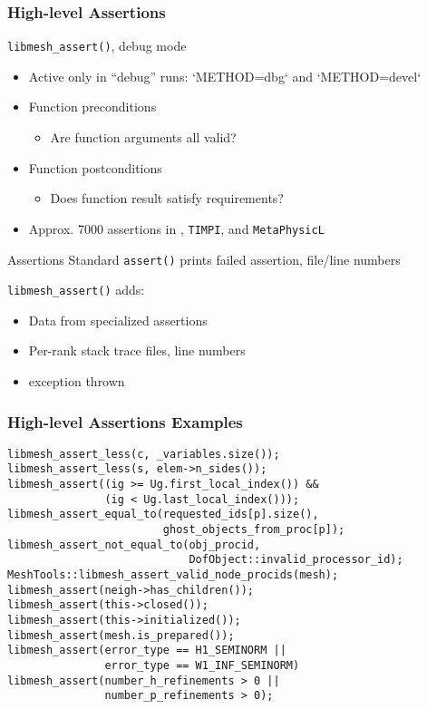 \begin{frame}
\frametitle{High-level Assertions}
\begin{block}{{\texttt{libmesh\_assert()}, \PETSc} debug mode}
\begin{itemize}
\item Active only in ``debug'' runs: `METHOD=dbg` and `METHOD=devel`
\item Function preconditions
\begin{itemize}
\item Are function arguments all valid?
\end{itemize}
\item Function postconditions
\begin{itemize}
\item Does function result satisfy requirements?
\end{itemize}
\item Approx. 7000 assertions in \libMesh{}, \texttt{TIMPI}, and
  \texttt{MetaPhysicL}
\end{itemize}
\end{block}

 \begin{block}{\libMesh{} Assertions}
Standard \texttt{assert()} prints failed assertion, file/line numbers

\texttt{libmesh\_assert()} adds:
\begin{itemize}
\item Data from specialized assertions
\item Per-rank stack trace files, line numbers
\item \cpp{} exception thrown
\end{itemize}
\end{block}

\end{frame}

\begin{frame}[fragile]
\frametitle{High-level Assertions Examples}
{\footnotesize
\begin{verbatim}
libmesh_assert_less(c, _variables.size());
libmesh_assert_less(s, elem->n_sides());
libmesh_assert((ig >= Ug.first_local_index()) &&
               (ig < Ug.last_local_index()));
libmesh_assert_equal_to(requested_ids[p].size(),
                        ghost_objects_from_proc[p]);
libmesh_assert_not_equal_to(obj_procid,
                            DofObject::invalid_processor_id);
MeshTools::libmesh_assert_valid_node_procids(mesh);
libmesh_assert(neigh->has_children());
libmesh_assert(this->closed());
libmesh_assert(this->initialized());
libmesh_assert(mesh.is_prepared());
libmesh_assert(error_type == H1_SEMINORM ||
               error_type == W1_INF_SEMINORM)
libmesh_assert(number_h_refinements > 0 ||
               number_p_refinements > 0);
\end{verbatim}
}
\end{frame}

